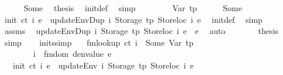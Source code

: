 \begin{isabellebody}
\ \ \ \ \isamarkupfalse%
\ Some\ \isamarkupfalse%
\ {\isacharquery}{\kern0pt}thesis\ \isamarkupfalse%
\ init{\isacharunderscore}{\kern0pt}def\ \isamarkupfalse%
\ simp\isanewline
\ \ \isamarkupfalse%
\isanewline
\ \ \ \ \isamarkupfalse%
\ {\isacharparenleft}{\kern0pt}Var\ tp{\isacharparenright}{\kern0pt}\isanewline
\ \ \ \ \isamarkupfalse%
\ Some\ \isamarkupfalse%
\ {\isachardoublequoteopen}init\ ct\ i\ e\ {\isacharequal}{\kern0pt}\ updateEnvDup\ i\ {\isacharparenleft}{\kern0pt}Storage\ tp{\isacharparenright}{\kern0pt}\ {\isacharparenleft}{\kern0pt}Storeloc\ i{\isacharparenright}{\kern0pt}\ e{\isachardoublequoteclose}\ \isamarkupfalse%
\ init{\isacharunderscore}{\kern0pt}def\ \isamarkupfalse%
\ simp\isanewline
\ \ \ \ \isamarkupfalse%
\ \isamarkupfalse%
\ assms\ \isamarkupfalse%
\ {\isachardoublequoteopen}updateEnvDup\ i\ {\isacharparenleft}{\kern0pt}Storage\ tp{\isacharparenright}{\kern0pt}\ {\isacharparenleft}{\kern0pt}Storeloc\ i{\isacharparenright}{\kern0pt}\ e\ {\isacharequal}{\kern0pt}\ e{\isachardoublequoteclose}\ \isamarkupfalse%
\ auto\isanewline
\ \ \ \ \isamarkupfalse%
\ \isamarkupfalse%
\ {\isacharquery}{\kern0pt}thesis\ \isamarkupfalse%
\ simp\isanewline
\ \ \isamarkupfalse%
\isanewline
{}\isamarkupfalse%
%
\endisatagproof
{\isafoldproof}%
%
\isadelimproof
\isanewline
%
\endisadelimproof
\isanewline
{}\isamarkupfalse%
\ init{\isacharunderscore}{\kern0pt}s{}{}{\isacharbrackleft}{\kern0pt}simp{\isacharbrackright}{\kern0pt}{\isacharcolon}{\kern0pt}\isanewline
\ \ \ {\isachardoublequoteopen}fmlookup\ ct\ i\ {\isacharequal}{\kern0pt}\ Some\ {\isacharparenleft}{\kern0pt}Var\ tp{\isacharparenright}{\kern0pt}{\isachardoublequoteclose}\isanewline
\ \ \ \ \ \ \ {\isachardoublequoteopen}{\isasymnot}\ i\ {\isacharbar}{\kern0pt}{\isasymin}{\isacharbar}{\kern0pt}\ fmdom\ {\isacharparenleft}{\kern0pt}denvalue\ e{\isacharparenright}{\kern0pt}{\isachardoublequoteclose}\isanewline
\ \ \ {\isachardoublequoteopen}init\ ct\ i\ e\ {\isacharequal}{\kern0pt}\ updateEnv\ i\ {\isacharparenleft}{\kern0pt}Storage\ tp{\isacharparenright}{\kern0pt}\ {\isacharparenleft}{\kern0pt}Storeloc\ i{\isacharparenright}{\kern0pt}\ e{\isachardoublequoteclose}\isanewline
%
\isadelimproof

\end{isabellebody}
